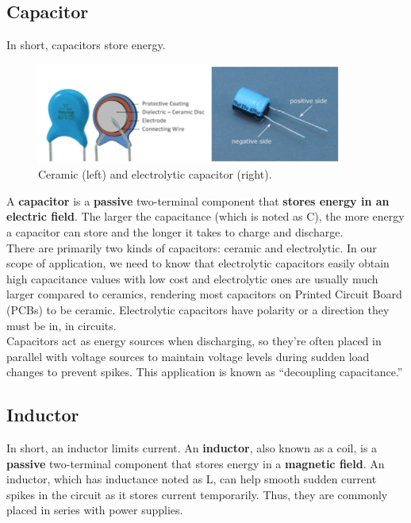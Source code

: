 \documentclass{article}
\begin{document}
\subsection{Capacitor}

In short, capacitors store energy. \\
\begin{figure} [h]
    \centering
    \includegraphics[width=0.9\textwidth]{img/Capacitors.png}
    \caption{Ceramic (left) and electrolytic capacitor (right).}
    \label{fig:capacitor}
\end{figure}

A \textbf{capacitor} is a \textbf{passive} two-terminal component that \textbf{stores energy in an electric field}. The larger the capacitance (which is noted as C), the more energy a capacitor can store and the longer it takes to charge and discharge.\\


There are primarily two kinds of capacitors: ceramic and electrolytic. In our scope of application, we need to know that electrolytic capacitors easily obtain high capacitance values with low cost and electrolytic ones are usually much larger compared to ceramics, rendering most capacitors on Printed Circuit Board (PCBs) to be ceramic. Electrolytic capacitors have polarity or a direction they must be in, in circuits. \\

Capacitors act as energy sources when discharging, so they’re often placed in parallel with voltage sources to maintain voltage levels during sudden load changes to prevent spikes. This application is known as “decoupling capacitance.”


\subsection{Inductor}

In short, an inductor limits current.
An \textbf{inductor}, also known as a coil, is a \textbf{passive} two-terminal component that stores energy in a \textbf{magnetic field}. An inductor, which has inductance noted as L, can help smooth sudden current spikes in the circuit as it stores current temporarily. Thus, they are commonly placed in series with power supplies. \\
\end{document}
